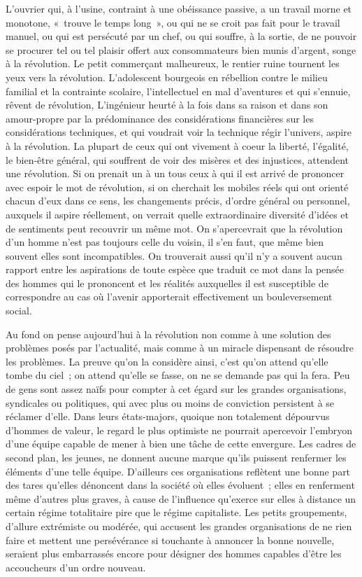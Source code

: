 \documentclass[french,twoside]{book} %
\begin{document}
L'ouvrier qui, à l'usine, contraint à une obéissance passive, a un travail morne et monotone, « trouve le temps long », ou qui ne se croit pas fait pour le travail manuel, ou qui est persécuté par un chef, ou qui souffre, à la sortie, de ne pouvoir se procurer tel ou tel plaisir offert aux consommateurs bien munis d'argent, songe à la révolution. Le petit commerçant malheureux, le rentier ruine tournent les yeux vers la révolution. L'adolescent bourgeois en rébellion contre le milieu familial et la contrainte scolaire, l'intellectuel en mal d'aventures et qui s'ennuie, rêvent de révolution, L'ingénieur heurté à la fois dans sa raison et dans son amour-propre par la prédominance des considérations financières sur les considérations techniques, et qui voudrait voir la technique régir l'univers, aspire à la révolution. La plupart de ceux qui ont vivement à coeur la liberté, l'égalité, le bien-être général, qui souffrent de voir des misères et des injustices, attendent une révolution. Si on prenait un à un tous ceux à qui il est arrivé de prononcer avec espoir le mot de révolution, si on cherchait les mobiles réels qui ont orienté chacun d'eux dans ce sens, les changements précis, d'ordre général ou personnel, auxquels il aspire réellement, on verrait quelle extraordinaire diversité d'idées et de sentiments peut recouvrir un même mot. On s'apercevrait que la révolution d'un homme n'est pas toujours celle du voisin, il s’en faut, que même bien souvent elles sont incompatibles. On trouverait aussi qu'il n'y a souvent aucun rapport entre les aspirations de toute espèce que traduit ce mot dans la pensée des hommes qui le prononcent et les réalités auxquelles il est susceptible de correspondre au cas où l'avenir apporterait effectivement un bouleversement social.\par
Au fond on pense aujourd'hui à la révolution non comme à une solution des problèmes posés par l'actualité, mais comme à un miracle dispensant de résoudre les problèmes. La preuve qu'on la considère ainsi, c'est qu'on attend qu'elle tombe du ciel ; on attend qu'elle se fasse, on ne se demande pas qui la fera. Peu de gens sont assez naïfs pour compter à cet égard sur les grandes organisations, syndicales ou politiques, qui avec plus ou moins de conviction persistent à se réclamer d'elle. Dans leurs états-majors, quoique non totalement dépourvus d'hommes de valeur, le regard le plus optimiste ne pourrait apercevoir l'embryon d'une équipe capable de mener à bien une tâche de cette envergure. Les cadres de second plan, les jeunes, ne donnent aucune marque qu'ils puissent renfermer les éléments d'une telle équipe. D'ailleurs ces organisations reflètent une bonne part des tares qu'elles dénoncent dans la société où elles évoluent ; elles en renferment même d'autres plus graves, à cause de l'influence qu'exerce sur elles à distance un certain régime totalitaire pire que le régime capitaliste. Les petits groupements, d'allure extrémiste ou modérée, qui accusent les grandes organisations de ne rien faire et mettent une persévérance si touchante à annoncer la bonne nouvelle, seraient plus embarrassés encore pour désigner des hommes capables d'être les accoucheurs d'un ordre nouveau.\par
\end{document}
